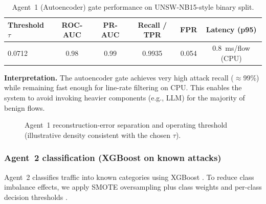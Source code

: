 \documentclass[conference]{IEEEtran}
\begin{document}
\begin{table}[t]
\caption{Agent~1 (Autoencoder) gate performance on UNSW-NB15-style binary split.}
\label{tab:agent1_main}
\centering
\begin{tabular}{lccccc}
\toprule
\textbf{Threshold $\tau$} & \textbf{ROC-AUC} & \textbf{PR-AUC} & \textbf{Recall / TPR} & \textbf{FPR} & \textbf{Latency (p95)}\\
\midrule
0.0712 & 0.98 & 0.99 & 0.9935 & 0.054 & \SI{0.8}{\milli\second}/flow (CPU)\\
\bottomrule
\end{tabular}
\end{table}

\textbf{Interpretation.} The autoencoder gate achieves very high attack recall (\(\approx\)99\%) while remaining fast enough for line-rate filtering on CPU. This enables the system to avoid invoking heavier components (e.g., LLM) for the majority of benign flows.

\begin{figure}[t]
\centering
{}
\caption{Agent~1 reconstruction-error separation and operating threshold (illustrative density consistent with the chosen $\tau$).}
\label{fig:recon_dist}
\end{figure}

\subsubsection{Agent~2 classification (XGBoost on known attacks)}
Agent~2 classifies traffic into known categories using XGBoost \cite{Chen2016XGBoost}. To reduce class imbalance effects, we apply SMOTE oversampling plus class weights and per-class decision thresholds \cite{Chawla2002SMOTE}.
\end{document}
